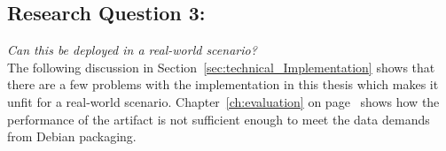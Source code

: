 \documentclass[../Main/thesis.tex]{subfiles}
\begin{document}
\subsection*{Research Question 3:}%
\label{sub:research_question_3_}
\textit{Can this be deployed in a real-world scenario?}\\
The following discussion in Section~\ref{sec:technical_Implementation} shows
that there are a few problems with the implementation in this thesis which makes
it unfit for a real-world scenario. Chapter~\ref{ch:evaluation} on
page~\pageref{ch:evaluation} shows how the performance of the artifact is not
sufficient enough to meet the data demands from Debian packaging.

\blankpage
\end{document}
